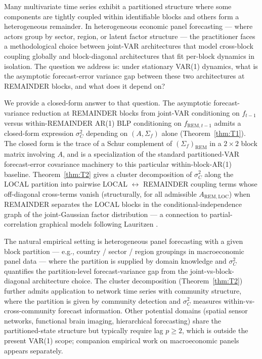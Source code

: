 \documentclass[11pt,letterpaper]{article}
\theoremstyle{remark}
\newcommand{\REM}{\mathrm{REM}}
\newcommand{\LOC}{\mathrm{LOC}}
\begin{document}
Many multivariate time series exhibit a partitioned structure where some components are tightly coupled within identifiable blocks and others form a heterogeneous remainder. In heterogeneous economic panel forecasting --- where actors group by sector, region, or latent factor structure --- the practitioner faces a methodological choice between joint-VAR architectures that model cross-block coupling globally and block-diagonal architectures that fit per-block dynamics in isolation. The question we address is: under stationary VAR(1) dynamics, what is the asymptotic forecast-error variance gap between these two architectures at REMAINDER blocks, and what does it depend on?

We provide a closed-form answer to that question. The asymptotic forecast-variance reduction at REMAINDER blocks from joint-VAR conditioning on $f_{t-1}$ versus within-REMAINDER AR(1) BLP conditioning on $f_{\REM, t-1}$ admits a closed-form expression $\sigma^2_C$ depending on $(A, \Sigma_f)$ alone (Theorem~\ref{thm:T1}). The closed form is the trace of a Schur complement of $(\Sigma_f)_\REM$ in a $2 \times 2$ block matrix involving $A$, and is a specialization of the standard partitioned-VAR forecast-error covariance machinery \cite[Ch.~2.2.2--3.5]{Lutkepohl2005} to this particular within-block-AR(1) baseline. Theorem~\ref{thm:T2} gives a cluster decomposition of $\sigma^2_C$ along the LOCAL partition into pairwise LOCAL $\leftrightarrow$ REMAINDER coupling terms whose off-diagonal cross-terms vanish (structurally, for all admissible $A_{\REM, \LOC}$) when REMAINDER separates the LOCAL blocks in the conditional-independence graph of the joint-Gaussian factor distribution --- a connection to partial-correlation graphical models following Lauritzen \cite{Lauritzen1996}.

The natural empirical setting is heterogeneous panel forecasting with a given block partition --- e.g., country / sector / region groupings in macroeconomic panel data --- where the partition is supplied by domain knowledge and $\sigma^2_C$ quantifies the partition-level forecast-variance gap from the joint-vs-block-diagonal architecture choice. The cluster decomposition (Theorem~\ref{thm:T2}) further admits application to network time series with community structure, where the partition is given by community detection and $\sigma^2_C$ measures within-vs-cross-community forecast information. Other potential domains (spatial sensor networks, functional brain imaging, hierarchical forecasting) share the partitioned-state structure but typically require lag $p \ge 2$, which is outside the present VAR(1) scope; companion empirical work on macroeconomic panels appears separately.
\end{document}
